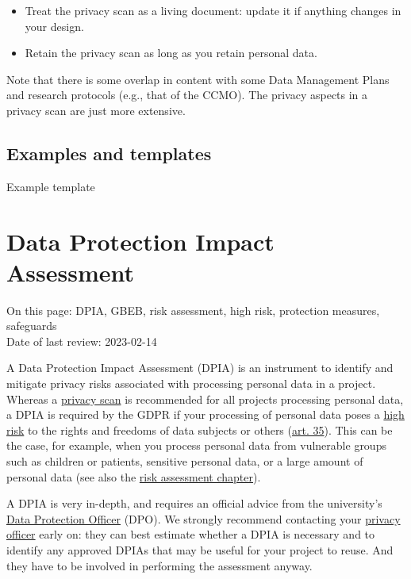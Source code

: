 \documentclass[
]{book}
\providecommand{\tightlist}{%
  \setlength{\itemsep}{0pt}\setlength{\parskip}{0pt}}
\begin{document}
\begin{itemize}
\tightlist
\item
  Treat the privacy scan as a living document: update it if anything changes
  in your design.\\
\item
  Retain the privacy scan as long as you retain personal data.
\end{itemize}

Note that there is some overlap in content with some Data Management Plans and
research protocols (e.g., that of the CCMO). The privacy aspects in a privacy
scan are just more extensive.

\hypertarget{examples-and-templates-1}{%
\subsection{Examples and templates}\label{examples-and-templates-1}}

Example template

\hypertarget{dpia}{%
\section{Data Protection Impact Assessment}\label{dpia}}

On this page: DPIA, GBEB, risk assessment, high risk, protection measures,
safeguards\\
Date of last review: 2023-02-14

A Data Protection Impact Assessment (DPIA) is an instrument to identify and
mitigate privacy risks associated with processing personal data in a project.
Whereas a \protect\hyperlink{privacy-scan}{privacy scan} is recommended for all projects
processing personal data, a DPIA is required by the GDPR if your processing of
personal data poses a \protect\hyperlink{high-risk-processing}{high risk} to the rights and
freedoms of data subjects or others
(\href{https://gdpr-info.eu/art-35-gdpr/}{art. 35}). This can be the
case, for example, when you process personal data from vulnerable groups such
as children or patients, sensitive personal data, or a large amount of personal
data (see also the \protect\hyperlink{risk-assessment}{risk assessment chapter}).

A DPIA is very in-depth, and requires an official advice from the university's
\href{https://intranet.uu.nl/en/knowledgebase/data-protection-officer}{Data Protection Officer}
(DPO). We strongly recommend contacting your \protect\hyperlink{support}{privacy officer}
early on: they can best estimate whether a DPIA is necessary and to identify
any approved DPIAs that may be useful for your project to reuse. And they have
to be involved in performing the assessment anyway.
\end{document}
